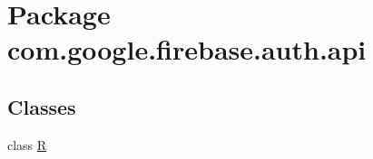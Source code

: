 \hypertarget{namespacecom_1_1google_1_1firebase_1_1auth_1_1api}{}\section{Package com.\+google.\+firebase.\+auth.\+api}
\label{namespacecom_1_1google_1_1firebase_1_1auth_1_1api}
\subsection*{Classes}
\begin{DoxyCompactItemize}
\item 
class \mbox{\hyperlink{classcom_1_1google_1_1firebase_1_1auth_1_1api_1_1R}{R}}
\end{DoxyCompactItemize}
